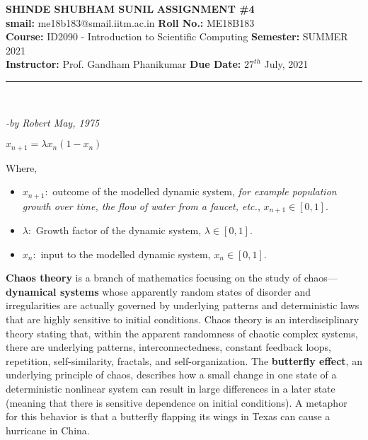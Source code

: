 \documentclass[a4paper, 11pt]{article}
\newenvironment{The Chaos Theory}[2][\centerline{\huge The Chaos Theory}]
    { \begin{mdframed}[backgroundcolor=gray!20] \textbf{#1 #2} \\}
    {  \end{mdframed}}
\begin{document}
\noindent
\large\textbf{SHINDE SHUBHAM SUNIL} \hfill \textbf{ASSIGNMENT \#4}   \\
\textbf{smail:} me18b183@smail.iitm.ac.in \hfill \textbf{Roll No.:} ME18B183 \\
\normalsize\textbf {Course:} ID2090 - Introduction to Scientific Computing \hfill \textbf{Semester:} SUMMER 2021 \\
\textbf{Instructor:} Prof. Gandham Phanikumar \hfill \textbf{Due Date:} $27^{th}$ July, 2021 \\
\noindent\rule{7in}{2.5pt}
\begin{The Chaos Theory}\\
\centerline{\textit{-by Robert May, 1975}}
\end{The Chaos Theory}
\begin{center}
\centerline{\huge $x_{n+1}=\lambda x_n(1-x_n)$}
\end{center}
Where,
\begin{itemize}
    \item $x_{n+1}:$ outcome of the modelled dynamic system, \textit{for example population growth over time, the flow of water from a faucet, etc.}, $x_{n+1}\in[0,1]$.
    \item $\lambda:$ Growth factor of the dynamic system, $\lambda\in [0,1]$.
    \item $x_n:$ input to the modelled dynamic system, $x_{n}\in[0,1]$.  
\end{itemize}
\textbf{Chaos theory} is a branch of mathematics focusing on the study of chaos—\textbf{dynamical systems} whose apparently random states of disorder and irregularities are actually governed by underlying patterns and deterministic laws that are highly sensitive to initial conditions. Chaos theory is an interdisciplinary theory stating that, within the apparent randomness of chaotic complex systems, there are underlying patterns, interconnectedness, constant feedback loops, repetition, self-similarity, fractals, and self-organization. The \textbf{butterfly effect}, an underlying principle of chaos, describes how a small change in one state of a deterministic nonlinear system can result in large differences in a later state (meaning that there is sensitive dependence on initial conditions). A metaphor for this behavior is that a butterfly flapping its wings in Texas can cause a hurricane in China.



\end{document}
